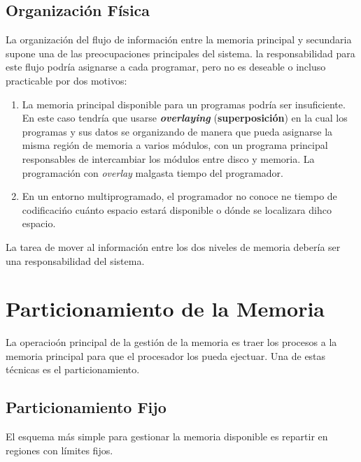 \documentclass[12pt, a4paper]{article}
\begin{document}
\subsection{Organización Física}
La organización del flujo de información entre la memoria principal y secundaria supone una de las preocupaciones principales del sistema. la responsabilidad para este flujo podría asignarse a cada programar, pero no es deseable o incluso practicable por dos motivos:
\begin{enumerate}
     \item La memoria principal disponible para un programas podría ser insuficiente. En este caso tendría que usarse \textbf{\textit{overlaying}} (\textbf{superposición}) en la cual los programas y sus datos se organizando de manera que pueda asignarse la misma región de memoria a varios módulos, con un programa principal responsables de intercambiar los módulos entre disco y memoria. La programación con \textit{overlay} malgasta tiempo del programador.
     \item En un entorno multiprogramado, el programador no conoce ne tiempo de codificacińo cuánto espacio estará disponible o dónde se localizara dihco espacio.
\end{enumerate}
La tarea de mover al información entre los dos niveles de memoria debería ser una responsabilidad del sistema.

\section{Particionamiento de la Memoria}
La operacioón principal de la gestión de la memoria es traer los procesos a la memoria principal para que el procesador los pueda ejectuar. Una de estas técnicas es el particionamiento.
\subsection{Particionamiento Fijo}
El esquema más simple para gestionar la memoria disponible es repartir en regiones con límites fijos.
\end{document}
